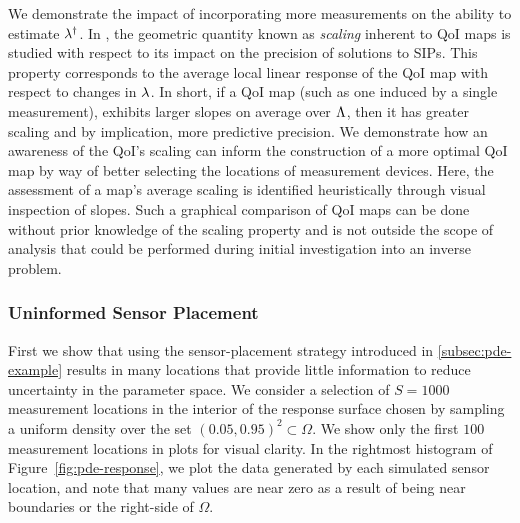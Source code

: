 We demonstrate the impact of incorporating more measurements on the ability to estimate $\lambda^\dagger$.
In \cite{Walsh}, the geometric quantity known as \emph{scaling} inherent to QoI maps is studied with respect to its impact on the precision of solutions to SIPs.
This property corresponds to the average local linear response of the QoI map with respect to changes in $\lambda$.
In short, if a QoI map (such as one induced by a single measurement), exhibits larger slopes on average over ${\Lambda}$, then it has greater scaling and by implication, more predictive precision.
We demonstrate how an awareness of the QoI's scaling can inform the construction of a more optimal QoI map by way of better selecting the locations of measurement devices.
Here, the assessment of a map's average scaling is identified heuristically through visual inspection of slopes.
Such a graphical comparison of QoI maps can be done without prior knowledge of the scaling property and is not outside the scope of analysis that could be performed during initial investigation into an inverse problem.

\FloatBarrier
\subsubsection{Uninformed Sensor Placement}
First we show that using the sensor-placement strategy introduced in \ref{subsec:pde-example} results in many locations that provide little information to reduce uncertainty in the parameter space.
We consider a selection of $S=1000$ measurement locations in the interior of the response surface chosen by sampling a uniform density over the set $(0.05, 0.95)^2 \subset \Omega$.
We show only the first $100$ measurement locations in plots for visual clarity.
In the rightmost histogram of Figure~\ref{fig:pde-response}, we plot the data generated by each simulated sensor location, and note that many values are near zero as a result of being near boundaries or the right-side of $\Omega$.

